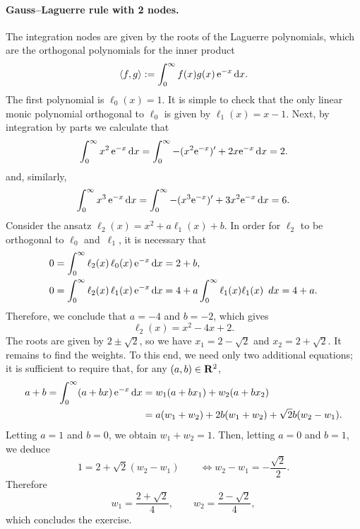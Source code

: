 \begin{solution}
    \paragraph{Gauss--Laguerre rule with 2 nodes.}
    The integration nodes are given by the roots of the Laguerre polynomials,
    which are the orthogonal polynomials for the inner product
    \[
        \langle f, g\rangle :=
        \int_{0}^{\infty} f(x) g(x) \, \mathrm e^{-x} \, \mathrm d x.
    \]
    The first polynomial is $\ell_0(x) = 1$.
    It is simple to check that the only linear monic polynomial orthogonal to $\ell_0$ is given by $\ell_1(x) = x - 1$.
    Next, by integration by parts we calculate that
    \[
        \int_{0}^{\infty} x^2 \, \mathrm e^{-x} \, \mathrm d x
        = \int_{0}^{\infty} - (x^2 \mathrm e^{-x})' + 2 x \mathrm e^{-x} \, \mathrm d x = 2.
    \]
    and, similarly,
    \[
        \int_{0}^{\infty} x^3 \, \mathrm e^{-x} \, \mathrm d x
        = \int_{0}^{\infty} - (x^3 \mathrm e^{-x})' + 3 x^2 \mathrm e^{-x} \, \mathrm d x = 6.
    \]
    Consider the ansatz $\ell_2(x) = x^2 + a \ell_1(x) + b$.
    In order for $\ell_2$ to be orthogonal to $\ell_0$ and~$\ell_1$,
    it is necessary that
    \begin{align*}
        0 &= \int_{0}^{\infty} \ell_{2}(x) \, \ell_0(x) \, \mathrm e^{-x} \, \mathrm d x = 2 + b, \\
        0 &= \int_{0}^{\infty} \ell_{2}(x) \, \ell_1(x) \, \mathrm e^{-x} \, \mathrm d x
        = 4 + a \int_{0}^{\infty} \ell_1(x) \ell_1(x) \, \ d x = 4 + a.
    \end{align*}
    Therefore, we conclude that $a = -4$ and $b=-2$,
    which gives
    \[
        \ell_2(x) = x^2 - 4 x + 2.
    \]
    The roots are given by $2 \pm \sqrt{2}$,
    so we have $x_1 = 2 - \sqrt{2}$ and $x_2 = 2 + \sqrt{2}$.
    It remains to find the weights.
    To this end, we need only two additional equations;
    it is sufficient to require that, for any $(a,b) \in \mathbf R^2$,
    \begin{align*}
        a + b =
            \int_{0}^{\infty} (a + bx) \, \mathrm e^{-x} \, \mathrm d x
    &= w_1 (a + b x_1) + w_2 (a + b x_2) \\
    &= a (w_1 + w_2) + 2 b (w_1 + w_2) + \sqrt{2} b (w_2 - w_1).
    \end{align*}
    Letting $a = 1$ and $b = 0$,
    we obtain $w_1 + w_2 = 1$.
    Then, letting $a = 0$ and $b = 1$,
    we deduce
    \[
        1 = 2 + \sqrt{2} (w_2 - w_1) \qquad \Leftrightarrow w_2 - w_1 = - \frac{\sqrt{2}}{2}.
    \]
    Therefore
    \[
        w_1 = \frac{2 + \sqrt{2}}{4}, \qquad w_2 = \frac{2 - \sqrt{2}}{4},
    \]
    which concludes the exercise.
\end{solution}

